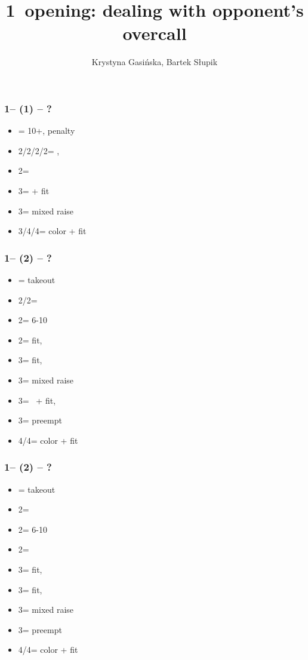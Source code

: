 \documentclass[12pt, a4paper]{article}
\title{1\spades\ opening: dealing with opponent's overcall}
\author{Krystyna Gasińska, Bartek Słupik}
\begin{document}
\maketitle


\subsubsection*{1\spades -- (1\nt) -- ?}
\begin{itemize}
    \item \dbl = 10+, penalty
    \item 2\clubs/2\diams/2\hearts/2\spades = \nat, \nf
    \item 2\nt = \minor
    \item 3\clubs = \inv + fit
    \item 3\diams = mixed raise
    \item 3\hearts/4\clubs/4\diams = color + fit
\end{itemize}

\subsubsection*{1\spades -- (2\clubs) -- ?}
\begin{itemize}
    \item \dbl = takeout
    \item 2\diams/2\hearts = \fonce
    \item 2\spades = 6-10
    \item 2\nt = fit, \gf
    \item 3\clubs = fit, \inv
    \item 3\diams = mixed raise
    \item 3\hearts = \hearts\ + fit, \inv
    \item 3\spades = preempt
    \item 4\diams/4\hearts = color + fit
\end{itemize}

\subsubsection*{1\spades -- (2\diams) -- ?}
\begin{itemize}
    \item \dbl = takeout
    \item 2\hearts = \fonce
    \item 2\spades = 6-10
    \item 2\nt = \clubs \invp
    \item 3\clubs = fit, \gf
    \item 3\diams = fit, \inv
    \item 3\hearts = mixed raise
    \item 3\spades = preempt
    \item 4\clubs/4\hearts = color + fit
\end{itemize}
\end{document}
